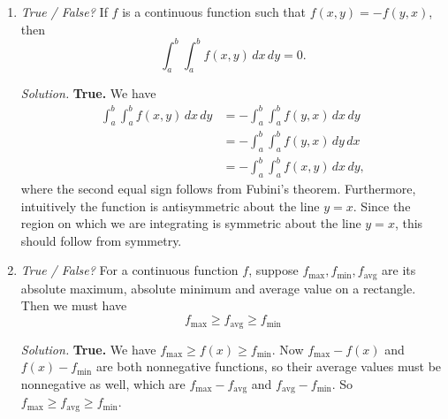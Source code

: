 \documentclass{article}
\begin{document}
\begin{enumerate}
\item {\em True / False?} If $f$ is a continuous function such that $f(x, y) = -f(y, x)$, then
\[
\int_a^b \int_a^b f(x, y) \,dx \,dy = 0.
\]

{\em Solution.} {\bf True.} We have
\begin{align*}
\int_a^b \int_a^b f(x, y) \,dx \,dy & = -\int_a^b \int_a^b f(y, x) \,dx \,dy \\
& = -\int_a^b \int_a^b f(y, x) \,dy \,dx \\
& = -\int_a^b \int_a^b f(x, y) \,dx \,dy,
\end{align*}
where the second equal sign follows from Fubini's theorem. Furthermore, intuitively the function is antisymmetric about the line $y = x$. Since the region on which we are integrating is symmetric about the line $y = x$, this should follow from symmetry.

\item {\em True / False?} For a continuous function $f$, suppose $f_{\text{max}}, f_{\text{min}}, f_{\text{avg}}$ are its absolute maximum, absolute minimum and average value on a rectangle. Then we must have
\[
f_{\text{max}} \ge f_{\text{avg}} \ge f_{\text{min}}
\]

{\em Solution.} {\bf True.} We have $f_{\text{max}} \ge f(x) \ge f_{\text{min}}$.
Now $f_{\text{max}} - f(x)$ and $f(x) - f_{\text{min}}$ are both nonnegative functions, so their average values must be nonnegative as well, which are $f_{\text{max}} - f_{\text{avg}}$ and $f_{\text{avg}} - f_{\text{min}}$. So $f_{\text{max}} \ge f_{\text{avg}} \ge f_{\text{min}}$.
\end{enumerate}
\end{document}
